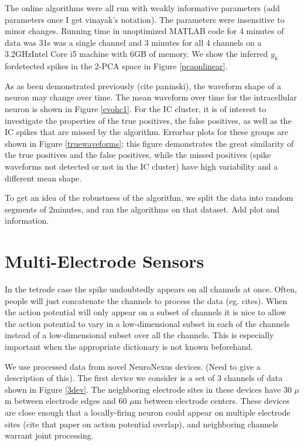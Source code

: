 \documentclass{article} %
\begin{document}
The online algorithms were all run with weakly informative parameters (add parameters once I get vinayak's notation). The parameters were insensitive to minor changes.  Running time in unoptimized MATLAB code for 4 minutes of data was 31s was a single channel and 3 minutes for all 4 channels on a 3.2GHzIntel Core i5 machine with 6GB of memory.  We show the inferred $y_k$ fordetected spikes in the 2-PCA space in Figure \ref{pcaonlinear}.

As as been demonstrated previously (cite paninski), the waveform shape of a neuron may change over time.  The mean waveform over time for the intracellular neuron is shown in Figure \ref{evohc1}.  For the IC cluster, it is of interest to investigate the properties of the true positives, the false positives, as well as the IC spikes that are missed by the algorithm.  Errorbar plots for these groups are shown in Figure \ref{truewaveforms}; this figure demonstrates the great similarity of the true positives and the false positives, while the missed positives (spike waveforms not detected or not in the IC cluster) have high variability and a different mean shape.

To get an idea of the robustness of the algorithm, we split the data into random segments of 2minutes, and ran the algorithms on that dataset.  Add plot and information.
\section{Multi-Electrode Sensors}
In the tetrode case the spike undoubtedly appears on all channels at once.  Often, people will just concatenate the channels to process the data (eg. cites).  When the action potential will only appear on a subset of channels it is nice to allow the action potential to vary in a low-dimensional subset in each of the channels instead of a low-dimensional subset over all the channels.  This is especially important when the appropriate dictionary is not known beforehand.

We use processed data from novel NeuroNexus devices.  (Need to give a description of this).  The first device we consider is a set of 3 channels of data shown in Figure \ref{3dev}.  The neighboring electrode sites in these devices have 30 $\mu$m between electrode edges and 60 $\mu$m between electrode centers.  These devices are close enough that a locally-firing neuron could appear on multiple electrode sites (cite that paper on action potential overlap), and neighboring channels warrant joint processing.
\end{document}
